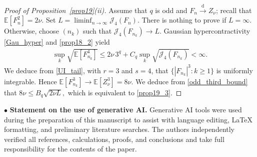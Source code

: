 \documentclass[letterpaper,11pt,reqno]{amsart}
\numberwithin{equation}{section}
\theoremstyle{plain}
\theoremstyle{definition}
\theoremstyle{remark}
\newcommand{\E}{\mathbb{E}}
\newcommand{\noi}{\noindent}
\newcommand{\Jfour}{\mathcal J_4}
\begin{document}
\begin{proof}[Proof of Proposition~\ref{prop19}{\rm(ii)}]
Assume that $q$ is odd and $F_n\xrightarrow{\mathrm d}Z_\nu$; recall
that $\E[F_n^2]=2\nu$.  Set
$L=\liminf_{n\to\infty}\Jfour(F_n)$.  There is nothing to prove if
$L=\infty$.  Otherwise, choose $(n_k)$ such that
$\Jfour(F_{n_k})\to L$.  Gaussian hypercontractivity
\eqref{Gau_hyper} and \eqref{prop18_2} yield
\noi
\begin{align*}
 \sup_k\sqrt{\E[F_{n_k}^4]}
 \leq2\nu\,3^q+C_q\sup_k\sqrt{\Jfour(F_{n_k})}<\infty.
\end{align*}
We deduce from \eqref{UI_tail}, with $r=3$ and $s=4$, that
$\{|F_{n_k}|^3:k\geq1\}$ is uniformly integrable.  Hence
$\E[F_{n_k}^3]\to\E[Z_\nu^3]=8\nu$.  We deduce from
\eqref{odd_third_bound} that
$
 8\nu\leq B_q\sqrt{2\nu L},
$
which is equivalent to \eqref{prop19_3}.
\end{proof}


\medskip
\noi
$\bullet$ {\bf Statement on the use of generative AI.}
Generative AI tools were used during the preparation of this
manuscript to assist with language editing, 
 LaTeX formatting, and preliminary literature searches.
The authors independently verified all references, calculations,
proofs, and conclusions and take full responsibility for the contents
of the paper.
\end{document}
